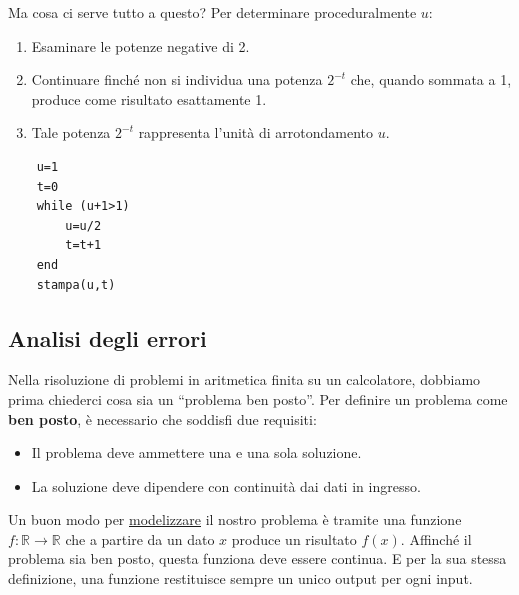 \documentclass{article}
\numberwithin{equation}{section}
\begin{document}
Ma cosa ci serve tutto a questo? Per determinare proceduralmente $u$:
\begin{enumerate}
    \item Esaminare le potenze negative di 2.
    \item Continuare finché non si individua una potenza $2^{-t}$ che, quando sommata a 1,
        produce come risultato esattamente 1.
    \item Tale potenza $2^{-t}$ rappresenta l'unità di arrotondamento $u$.
\end{enumerate}
\begin{verbatim}
    u=1
    t=0
    while (u+1>1)
        u=u/2
        t=t+1
    end 
    stampa(u,t)
\end{verbatim}
\subsection{Analisi degli errori}
Nella risoluzione di problemi in aritmetica finita su un calcolatore, dobbiamo
prima chiederci cosa sia un ``problema ben posto''. Per definire un problema come 
\textbf{ben posto}, è necessario che soddisfi due requisiti:
\begin{itemize}
    \item Il problema deve ammettere una e
        una sola soluzione.
    \item La soluzione deve dipendere con
        continuità dai dati in ingresso.
\end{itemize}
Un buon modo per \underline{modelizzare} il nostro problema è tramite una funzione 
$f:\mathbb{R}\rightarrow \mathbb{R}$ che a partire da un dato $x$ produce un
risultato $f(x)$. Affinché il problema sia ben
posto, questa funziona deve essere continua. E per la sua stessa
definizione, una funzione restituisce sempre un unico output per ogni input.
\end{document}
